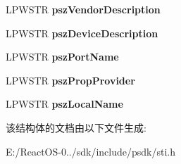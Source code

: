 \begin{DoxyCompactItemize}
L\+P\+W\+S\+TR {\bfseries psz\+Vendor\+Description}
\item 
\mbox{\label{struct___s_t_i___d_e_v_i_c_e___i_n_f_o_r_m_a_t_i_o_n_w_ae5c811b512e4e351cd77a0c7d6d273e7}} 
L\+P\+W\+S\+TR {\bfseries psz\+Device\+Description}
\item 
\mbox{\label{struct___s_t_i___d_e_v_i_c_e___i_n_f_o_r_m_a_t_i_o_n_w_a4263bdbe2206663ef9ae6b5408985e22}} 
L\+P\+W\+S\+TR {\bfseries psz\+Port\+Name}
\item 
\mbox{\label{struct___s_t_i___d_e_v_i_c_e___i_n_f_o_r_m_a_t_i_o_n_w_a5a45973ce132eb9ee98ea0fa59eb57d6}} 
L\+P\+W\+S\+TR {\bfseries psz\+Prop\+Provider}
\item 
\mbox{\label{struct___s_t_i___d_e_v_i_c_e___i_n_f_o_r_m_a_t_i_o_n_w_a135114f1bb38e135480aad8aaafa72c3}} 
L\+P\+W\+S\+TR {\bfseries psz\+Local\+Name}
\end{DoxyCompactItemize}


该结构体的文档由以下文件生成\+:\begin{DoxyCompactItemize}
\item 
E\+:/\+React\+O\+S-\/0../sdk/include/psdk/sti.\+h\end{DoxyCompactItemize}
